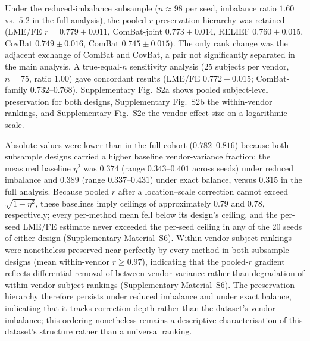 \documentclass[12pt,a4paper]{article}
\begin{document}
Under the reduced-imbalance subsample ($n\approx98$ per seed, imbalance ratio $1.60$ vs.\ $5.2$ in the full analysis), the pooled-$r$ preservation hierarchy was retained (LME/FE $r=0.779\pm0.011$, ComBat-joint $0.773\pm0.014$, RELIEF $0.760\pm0.015$, CovBat $0.749\pm0.016$, ComBat $0.745\pm0.015$). The only rank change was the adjacent exchange of ComBat and CovBat, a pair not significantly separated in the main analysis. A true-equal-$n$ sensitivity analysis (25 subjects per vendor, $n=75$, ratio $1.00$) gave concordant results (LME/FE $0.772\pm0.015$; ComBat-family $0.732$--$0.768$). Supplementary Fig.~S2a shows pooled subject-level preservation for both designs, Supplementary Fig.~S2b the within-vendor rankings, and Supplementary Fig.~S2c the vendor effect size on a logarithmic scale.

Absolute values were lower than in the full cohort ($0.782$--$0.816$) because both subsample designs carried a higher baseline vendor-variance fraction: the measured baseline $\eta^2$ was $0.374$ (range $0.343$--$0.401$ across seeds) under reduced imbalance and $0.389$ (range $0.337$--$0.431$) under exact balance, versus $0.315$ in the full analysis. Because pooled $r$ after a location--scale correction cannot exceed $\sqrt{1-\eta^2}$, these baselines imply ceilings of approximately $0.79$ and $0.78$, respectively; every per-method mean fell below its design's ceiling, and the per-seed LME/FE estimate never exceeded the per-seed ceiling in any of the 20 seeds of either design (Supplementary Material~S6). Within-vendor subject rankings were nonetheless preserved near-perfectly by every method in both subsample designs (mean within-vendor $r\geq0.97$), indicating that the pooled-$r$ gradient reflects differential removal of between-vendor variance rather than degradation of within-vendor subject rankings (Supplementary Material~S6). The preservation hierarchy therefore persists under reduced imbalance and under exact balance, indicating that it tracks correction depth rather than the dataset's vendor imbalance; this ordering nonetheless remains a descriptive characterisation of this dataset's structure rather than a universal ranking.
\end{document}
